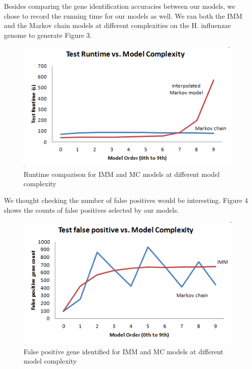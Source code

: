\documentclass[11pt,letterpaper]{article}
\begin{document}
Besides comparing the gene identification accuracies between our models, we chose to record the running time for our models as well. We ran both the IMM and the Markov chain models at different complexities on the H. influenzae genome to generate Figure 3. 

\begin{figure}
	\begin{center}
		\includegraphics[scale=0.8]{plots/runtime_vs_model_complexity.png}
	\end{center}
	\caption{\label{font-table} Runtime comparison for IMM and MC models at different model complexity}
\end{figure}

We thought checking the number of false positives would be interesting. Figure 4 shows the counts of false positives selected by our models. 

\begin{figure}
	\begin{center}
		\includegraphics[scale=0.8]{plots/false_positives_vs_model_complexity.png}
	\end{center}
	\caption{\label{font-table} False positive gene identified for IMM and MC models at different model complexity}
\end{figure}
\end{document}
